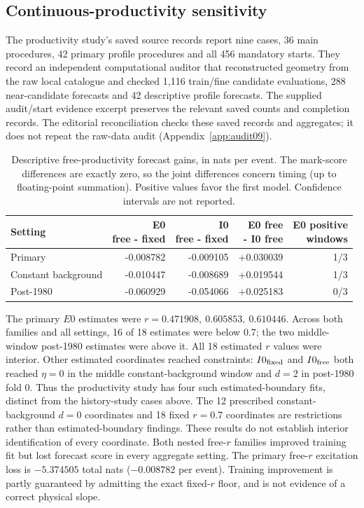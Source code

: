 \subsection{Continuous-productivity sensitivity}

The productivity study's saved source records report nine cases, 36 main
procedures, 42 primary profile procedures and all 456 mandatory starts.
They record an independent computational auditor that reconstructed geometry from the
raw local catalogue and checked 1,116 train/fine candidate evaluations,
288 near-candidate forecasts and 42 descriptive profile forecasts. The
supplied audit/start evidence excerpt preserves the relevant saved counts
and completion records. The editorial reconciliation checks these saved
records and aggregates; it does not repeat the raw-data audit
(Appendix~\ref{app:audit09}).

\begin{table}[tbp]
\centering\small
\caption{Descriptive free-productivity forecast gains, in nats per event. The mark-score
differences are exactly zero, so the joint differences concern timing
(up to floating-point summation). Positive values favor the first model. Confidence intervals are not reported.}
\label{a2:productivity-results}
\begin{tabular}{lrrrr}
\toprule
Setting & \shortstack{E0\\free - fixed} &
\shortstack{I0\\free - fixed} &
\shortstack{E0 free\\- I0 free} &
\shortstack{E0 positive\\windows}\\
\midrule
Primary & -0.008782 & -0.009105 & +0.030039 & 1/3\\
Constant background & -0.010447 & -0.008689 & +0.019544 & 1/3\\
Post-1980 & -0.060929 & -0.054066 & +0.025183 & 0/3\\
\bottomrule
\end{tabular}
\end{table}

The primary \(E0\) estimates were
\(r=0.471908,\ 0.605853,\ 0.610446\). Across both families and all settings,
16 of 18 estimates were below \(0.7\); the two middle-window post-1980
estimates were above it. All 18 estimated \(r\) values were interior.
Other estimated coordinates reached constraints: \(I0_{\rm fixed}\)
and \(I0_{\rm free}\) both reached \(\eta=0\) in the middle
constant-background window and \(d=2\) in post-1980 fold 0. Thus the
productivity study has four such estimated-boundary fits, distinct from
the history-study cases above. The 12 prescribed constant-background \(d=0\) coordinates and 18 fixed
\(r=0.7\) coordinates are restrictions rather than estimated-boundary
findings.
These results do not establish interior identification of every coordinate.
Both nested free-\(r\) families improved training fit but lost forecast
score in every aggregate setting. The primary free-\(r\) excitation loss is \(-5.374505\) total nats (\(-0.008782\) per event). Training improvement is partly guaranteed by
admitting the exact fixed-\(r\) floor, and is not evidence of a correct
physical slope.


